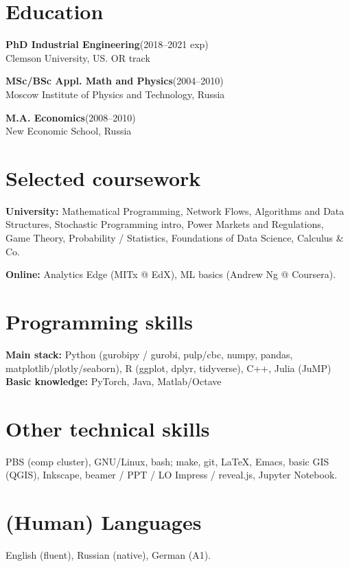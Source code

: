 \documentclass[11pt]{article} \usepackage{geometry} %
\newcommand{\edu}[3]{
  \textbf{#1}\hfill (#2)\\
  #3\vspace{0.7em}}
\begin{document}
 \noindent
 \begin{minipage}[t]{0.49\textwidth}
   \section*{Education}
   \edu{PhD Industrial Engineering}{2018--2021 exp}{
     Clemson University, US. OR track}

   \edu{MSc/BSc Appl. Math and Physics}{2004--2010}{
   Moscow Institute of Physics and Technology, Russia}

   \edu{M.A. Economics}{2008--2010}{
   New Economic School, Russia}
 \section*{Selected coursework}
 \textbf{University:} Mathematical Programming, Network Flows, Algorithms and Data Structures,
 Stochastic Programming intro, Power Markets and Regulations, Game Theory,
 Probability / Statistics, Foundations of Data Science, Calculus \& Co.\vspace{0.5em}

 \textbf{Online:} Analytics Edge (MITx @ EdX), ML basics (Andrew Ng @ Coursera).\\
   \section*{Programming skills}
   \textbf{Main stack:} Python (gurobipy / gurobi, pulp/cbc, numpy, pandas,
   matplotlib/plotly/seaborn), R (ggplot, dplyr, tidyverse), C++, Julia (JuMP)\\
   \textbf{Basic knowledge:} PyTorch, Java, Matlab/Octave\\
   \section*{Other technical skills}
   PBS (comp cluster), GNU/Linux, bash; make, git, \LaTeX, Emacs, basic GIS
   (QGIS), Inkscape, beamer / PPT / LO Impress / reveal.js, Jupyter Notebook.
   \vspace{0.5em}

   \section*{(Human) Languages}
   English (fluent), Russian (native), German (A1).
 \end{minipage}\hfill%
\end{document}
